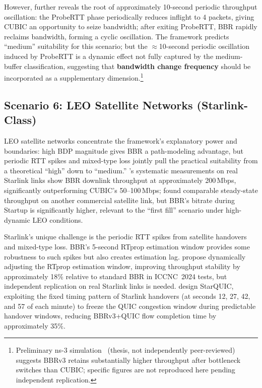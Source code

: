 \documentclass[a4paper,fleqn]{cas-sc}
\begin{document}
However, \citet{miyazawa2020mechanism} further reveals the root of approximately
10-second periodic throughput oscillation: the ProbeRTT phase periodically reduces
inflight to 4 packets, giving CUBIC an opportunity to seize bandwidth; after
exiting ProbeRTT, BBR rapidly reclaims bandwidth, forming a cyclic oscillation.
The framework predicts ``medium'' suitability for this scenario; but the
$\approx$10-second periodic oscillation induced by ProbeRTT is a dynamic effect
not fully captured by the medium-buffer classification, suggesting that
\textbf{bandwidth change frequency} should be incorporated as a supplementary
dimension.\footnote{Preliminary ns-3 simulation~\citep{sologon2025thesis} (thesis, not
independently peer-reviewed) suggests BBRv3 retains substantially higher
throughput after bottleneck switches than CUBIC; specific figures are not
reproduced here pending independent replication.}

\subsection{Scenario 6: LEO Satellite Networks (Starlink-Class)}
\label{sec:leo}

LEO satellite networks concentrate the framework's explanatory power and
boundaries: high BDP magnitude gives BBR a path-modeling advantage, but periodic
RTT spikes and mixed-type loss jointly pull the practical suitability from a
theoretical ``high'' down to ``medium.'' \citet{deutschmann2023starlink}'s
systematic measurements on real Starlink links show BBR downlink throughput at
approximately 200\,Mbps, significantly outperforming CUBIC's 50--100\,Mbps;
\citet{claypool2021satellite} found comparable steady-state throughput on another
commercial satellite link, but BBR's bitrate during Startup is significantly
higher, relevant to the ``first fill'' scenario under high-dynamic LEO conditions.

Starlink's unique challenge is the periodic RTT spikes from satellite handovers
and mixed-type loss. BBR's 5-second RTprop estimation window provides some
robustness to such spikes but also creates estimation lag. \citet{wang2024bbr_leo}
propose dynamically adjusting the RTprop estimation window, improving throughput
stability by approximately 18\% relative to standard BBR in ICCNC~2024 tests, but
independent replication on real Starlink links is needed. \citet{kamel2024starquic}
design StarQUIC, exploiting the fixed timing pattern of Starlink handovers (at
seconds 12, 27, 42, and 57 of each minute) to freeze the QUIC congestion window
during predictable handover windows, reducing BBRv3+QUIC flow completion time by
approximately 35\%.
\end{document}
